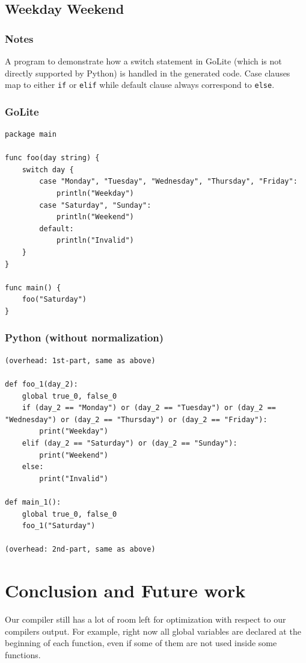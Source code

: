 \documentclass{article}
\begin{document}
\subsection{Weekday Weekend}
\subsubsection{Notes}
A program to demonstrate how a switch statement in GoLite (which is not directly supported by Python) is handled in the generated code. Case clauses map
to either \texttt{if} or \texttt{elif} while default clause always correspond to \texttt{else}.

\subsubsection{GoLite}
\begin{lstlisting}
package main

func foo(day string) {
    switch day {
        case "Monday", "Tuesday", "Wednesday", "Thursday", "Friday":
            println("Weekday")
        case "Saturday", "Sunday":
            println("Weekend")
        default:
            println("Invalid")
    }
}

func main() {
    foo("Saturday")
}

\end{lstlisting}
\subsubsection{Python (without normalization)}
\begin{lstlisting}
(overhead: 1st-part, same as above)

def foo_1(day_2):
	global true_0, false_0
	if (day_2 == "Monday") or (day_2 == "Tuesday") or (day_2 == "Wednesday") or (day_2 == "Thursday") or (day_2 == "Friday"):
		print("Weekday")
	elif (day_2 == "Saturday") or (day_2 == "Sunday"):
		print("Weekend")
	else:
		print("Invalid")

def main_1():
	global true_0, false_0
	foo_1("Saturday")

(overhead: 2nd-part, same as above)
\end{lstlisting}

\section{Conclusion and Future work}

Our compiler still has a lot of room left for optimization with respect to our compilers output. For example, right now all global variables are declared at the beginning of each function, even if some of them are not used inside some functions.
\end{document}
